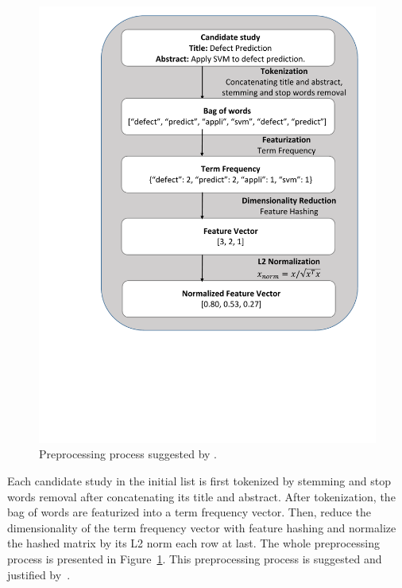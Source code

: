 \documentclass[final,twocolumn,5p]{elsarticle}
\theoremstyle{break}
\begin{document}
\begin{figure}[t]
    \centering
    \includegraphics[width=\linewidth]{Preprocessing.pdf}
    \caption{Preprocessing process suggested by \cite{krishna2016bigse}.}
    \label{fig: preprocessing}
\end{figure}

Each candidate study in the initial list is first tokenized by stemming and stop words removal after concatenating its title and abstract. After tokenization, the bag of words are featurized into a term frequency vector. Then, reduce the dimensionality of the term frequency vector with feature hashing and normalize the hashed matrix by its L2 norm each row at last. The whole preprocessing process is presented in Figure~\ref{fig: preprocessing}. This preprocessing process is suggested and justified by~\cite{krishna2016bigse}.
\end{document}
